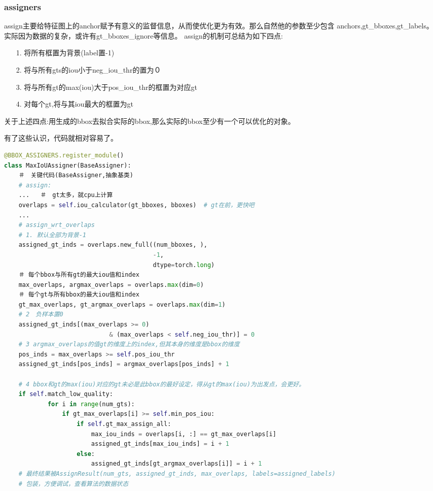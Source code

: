 \documentclass[UTF8]{ctexart}
\begin{document}
\subsubsection{assigners}
assign主要给特征图上的anchor赋予有意义的监督信息，从而使优化更为有效。那么自然他的参数至少包含
anchors,gt\_bboxes,gt\_labels。实际因为数据的复杂，或许有gt\_bboxes\_ignore等信息。
assign的机制可总结为如下四点:
\begin{itemize}
    \item[1.] 将所有框置为背景(label置-1)
    \item[2.] 将与所有gts的iou小于neg\_iou\_thr的置为０
    \item[3.] 将与所有gt的max(iou)大于pos\_iou\_thr的框置为对应gt
    \item[4.] 对每个gt,将与其iou最大的框置为gt
\end{itemize}
关于上述四点:用生成的bbox去拟合实际的bbox,那么实际的bbox至少有一个可以优化的对象。

有了这些认识，代码就相对容易了。
\lstset{style=mystyle}
\begin{lstlisting}[language=Python]
@BBOX_ASSIGNERS.register_module()
class MaxIoUAssigner(BaseAssigner):
    ＃　关键代码(BaseAssigner,抽象基类)
    # assign:
    ...   ＃　gt太多，就cpu上计算
    overlaps = self.iou_calculator(gt_bboxes, bboxes)  # gt在前，更快吧
    ...
    # assign_wrt_overlaps
    # 1. 默认全部为背景-1
    assigned_gt_inds = overlaps.new_full((num_bboxes, ),
                                         -1,
                                         dtype=torch.long)
    ＃ 每个bbox与所有gt的最大iou值和index
    max_overlaps, argmax_overlaps = overlaps.max(dim=0)
    ＃ 每个gt与所有bbox的最大iou值和index　
    gt_max_overlaps, gt_argmax_overlaps = overlaps.max(dim=1)
    # 2　负样本置0
    assigned_gt_inds[(max_overlaps >= 0)
                             & (max_overlaps < self.neg_iou_thr)] = 0
    # 3 argmax_overlaps的值gt的维度上的index,但其本身的维度是bbox的维度
    pos_inds = max_overlaps >= self.pos_iou_thr
    assigned_gt_inds[pos_inds] = argmax_overlaps[pos_inds] + 1
    
    # 4 bbox和gt的max(iou)对应的gt未必是此bbox的最好设定，得从gt的max(iou)为出发点，会更好。
    if self.match_low_quality:
            for i in range(num_gts):
                if gt_max_overlaps[i] >= self.min_pos_iou:
                    if self.gt_max_assign_all:
                        max_iou_inds = overlaps[i, :] == gt_max_overlaps[i]
                        assigned_gt_inds[max_iou_inds] = i + 1
                    else:
                        assigned_gt_inds[gt_argmax_overlaps[i]] = i + 1
    # 最终结果被AssignResult(num_gts, assigned_gt_inds, max_overlaps, labels=assigned_labels)
    # 包装，方便调试，查看算法的数据状态
\end{lstlisting}
\end{document}
